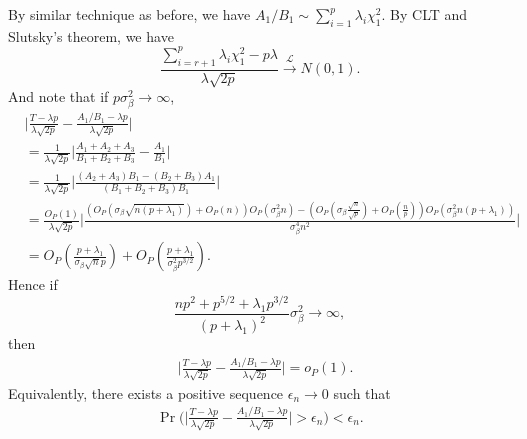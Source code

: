 \documentclass[review]{elsarticle}
\theoremstyle{plain}
\theoremstyle{definition}
\theoremstyle{remark}
\begin{document}
By similar technique as before, we have $A_1/B_1\sim \sum_{i=1}^p \lambda_i \chi^2_1$. By CLT and Slutsky's theorem, we have
\begin{equation*}
    \frac{\sum_{i=r+1}^p \lambda_i \chi^2_1-p\lambda}{\lambda\sqrt{2p}}\xrightarrow{\mathcal{L}}N(0,1).
\end{equation*}
And note that if $p \sigma_{\beta}^2\to \infty$,
\begin{equation*}
    \begin{aligned}
        &\Big|\frac{T-{\lambda p}}{\lambda\sqrt{2p}
        }-
    \frac{{A_1}/{B_1}-{\lambda p}}{\lambda\sqrt{2p}
        }\Big|\\
        &=
        \frac{1}{\lambda\sqrt{2p}}
        \Big|
        \frac{A_1+A_2+A_3}{B_1+B_2+B_3}-\frac{A_1}{B_1}
        \Big|\\
        &=
        \frac{1}{\lambda\sqrt{2p}}
        \Big|
        \frac{(A_2+A_3)B_1-(B_2+B_3)A_1}{(B_1+B_2+B_3)B_1}
        \Big|\\
        &=
        \frac{O_{P}(1)}{\lambda\sqrt{2p}}
        \Big|
        \frac{(O_P(\sigma_{\beta}\sqrt{n(p+\lambda_1)})+O_P(n))O_P(\sigma^2_\beta n)-(O_P(\sigma_{\beta}\frac{\sqrt{n}}{\sqrt{p}})+O_P(\frac{n}{p}))O_P(\sigma^2_{\beta} n(p+\lambda_1))}{\sigma^4_{\beta}n^2}
        \Big|\\
        &=O_P(\frac{p+\lambda_1}{\sigma_{\beta}\sqrt{n}p})+O_P(\frac{p+\lambda_1}{\sigma^2_{\beta}p^{3/2}}).
    \end{aligned}
\end{equation*}
Hence if 
\begin{equation*}
    \frac{np^2+p^{5/2}+\lambda_1 p^{3/2}}{{(p+\lambda_1)}^2}\sigma^2_{\beta}\to \infty,
\end{equation*}
then
\begin{equation}\label{proEps}
    \begin{aligned}
        &\Big|\frac{T-{\lambda p}}{\lambda\sqrt{2p}
        }-
    \frac{{A_1}/{B_1}-{\lambda p}}{\lambda\sqrt{2p}
        }\Big|=o_P(1).
    \end{aligned}
\end{equation}
Equivalently, there exists a positive sequence $\epsilon_n\to 0$ such that
\begin{equation*}
    \begin{aligned}
        \Pr\Big(\Big|\frac{T-{\lambda p}}{\lambda\sqrt{2p}
        }-
    \frac{{A_1}/{B_1}-{\lambda p}}{\lambda\sqrt{2p}
        }\Big|>\epsilon_n\Big)< \epsilon_n.
    \end{aligned}
\end{equation*}
\end{document}
